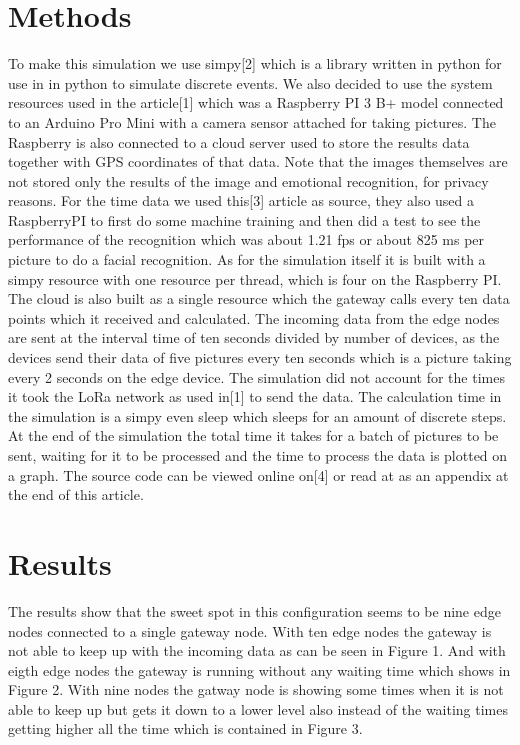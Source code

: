 \documentclass[a4paper,11pt,notitlepage,twocolumn]{article}
\begin{document}
  \section{Methods}
    To make this simulation we use simpy[2] which is a library written in python for use in
    in python to simulate discrete events. We also decided to use the system resources used
    in the article[1] which was a Raspberry PI 3 B+ model connected to an Arduino Pro Mini
    with a camera sensor attached for taking pictures. The Raspberry is also connected to a
    cloud server used to store the results data together with GPS coordinates of that data.
    Note that the images themselves are not stored only the results of the image and
    emotional recognition, for privacy reasons. For the time data we used this[3] article as
    source, they also used a RaspberryPI to first do some machine training and then did a test
    to see the performance of the recognition which was about 1.21 fps or about 825 ms per
    picture to do a facial recognition. As for the simulation itself it is built with a 
    simpy resource with one resource per thread, which is four on the Raspberry PI. The
    cloud is also built as a single resource which the gateway calls every ten data points
    which it received and calculated. The incoming data from the edge nodes are sent at the
    interval time of ten seconds divided by number of devices, as the devices send their data
    of five pictures every ten seconds which is a picture taking every 2 seconds on the edge
    device. The simulation did not account for the times it took the LoRa network as used in[1]
    to send the data. The calculation time in the simulation is a simpy even sleep which sleeps
    for an amount of discrete steps. At the end of the simulation the total time it takes for
    a batch of pictures to be sent, waiting for it to be processed and the time to process
    the data is plotted on a graph. The source code can be viewed online on[4] or read at
    as an appendix at the end of this article.
  
  \section{Results}
    The results show that the sweet spot in this configuration seems to be nine edge nodes
    connected to a single gateway node. With ten edge nodes the gateway is not able to keep
    up with the incoming data as can be seen in Figure 1. And with eigth edge nodes the gateway is
    running without any waiting time which shows in Figure 2. With nine nodes the gatway node is
    showing some times when it is not able to keep up but gets it down to a lower level also
    instead of the waiting times getting higher all the time which is contained in Figure 3. 
    
\end{document}
